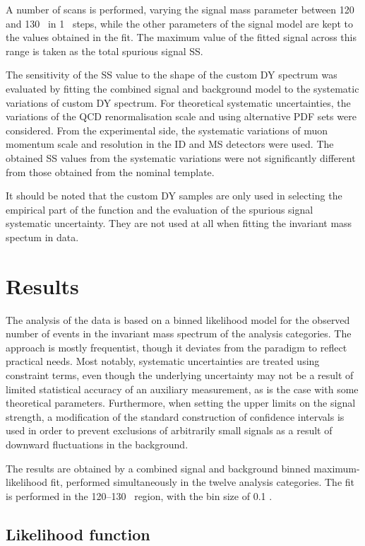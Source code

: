 A number of scans is performed, varying the signal mass parameter
between 120 and 130 \GeV~in 1 \GeV~steps, while the other parameters
of the signal model are kept to the values obtained in the fit.
The maximum value of the fitted signal across this range is taken
as the total spurious signal SS.

The sensitivity of the SS value to the shape of the custom DY
spectrum was evaluated by fitting the combined signal and
background model to the systematic variations of custom DY
spectrum. For theoretical systematic uncertainties, the variations
of the QCD renormalisation scale and using alternative PDF sets
were considered. From the experimental side, the systematic
variations of muon momentum scale and resolution in the ID and
MS detectors were used. The obtained SS values from the
systematic variations were not significantly different from
those obtained from the nominal template.

It should be noted that the custom DY samples are only used in
selecting the empirical part of the function and the evaluation
of the spurious signal systematic uncertainty. They are not used
at all when fitting the invariant mass spectum in data.

\section{Results}

The analysis of the data is based on a binned likelihood model
for the observed number of events in the invariant mass spectrum
of the analysis categories. The approach is mostly frequentist,
though it deviates from the paradigm to reflect practical needs.
Most notably, systematic uncertainties are treated using
constraint terms, even though the underlying uncertainty may not
be a result of limited statistical accuracy of an auxiliary
measurement, as is the case with some theoretical parameters.
Furthermore, when setting the upper limits on the signal
strength, a modification of the standard construction of
confidence intervals is used in order to prevent exclusions of
arbitrarily small signals as a result of downward fluctuations
in the background.

The results are obtained by a combined signal and background
binned maximum-likelihood fit, performed simultaneously in the
twelve analysis categories. The fit is performed in the 120--130
\GeV~region, with the bin size of 0.1 \GeV.

\subsection{Likelihood function}

